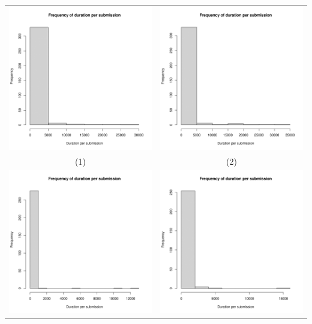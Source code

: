\documentclass[a4paper]{article}
\theoremstyle{definition}
\begin{document}
\begin{enumerate}[a)]
\begin{itemize}
\begin{center}
\begin{tabular}{c c}
                 \includegraphics[width = 6.9cm]{Images/img4-4-1.png} & \includegraphics[width = 6.9cm]{Images/img4-4-2.png} \\
                 (1) & (2) \\
                 \includegraphics[width = 6.9cm]{Images/img4-4-3.png} &
                 \includegraphics[width = 6.9cm]{Images/img4-4-4.png} \\

\end{tabular}
\end{center}
\end{itemize}
\end{enumerate}
\end{document}

